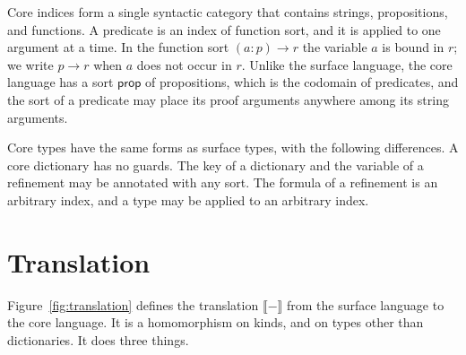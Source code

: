 \documentclass[11pt]{article}
\newcommand{\kw}[1]{\mathsf{#1}}
\newcommand{\prop}{\kw{prop}}
\newcommand{\sem}[1]{\llbracket #1 \rrbracket}
\theoremstyle{remark}
\begin{document}
Core indices form a single syntactic category that contains strings, propositions, and functions.
A predicate is an index of function sort, and it is applied to one argument at a time. In the
function sort $(a : p) \to r$ the variable $a$ is bound in $r$; we write $p \to r$ when $a$ does not
occur in $r$. Unlike the surface language, the core language has a sort $\prop$ of propositions,
which is the codomain of predicates, and the sort of a predicate may place its proof arguments
anywhere among its string arguments.

Core types have the same forms as surface types, with the following differences. A core dictionary
has no guards. The key of a dictionary and the variable of a refinement may be annotated with any
sort. The formula of a refinement is an arbitrary index, and a type may be applied to an arbitrary
index.

\FloatBarrier
\section{Translation}
\label{sec:translation}

Figure~\ref{fig:translation} defines the translation $\sem{-}$ from the surface language to the
core language. It is a homomorphism on kinds, and on types other than dictionaries. It does three
things.
\end{document}
